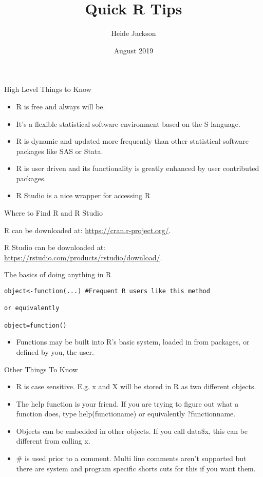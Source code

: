 \documentclass{beamer}
\title{Quick R Tips}
\author{Heide Jackson }
\date{August 2019}
\begin{document}
\maketitle

\begin{frame}{High Level Things to Know}
\begin{itemize}
\item R is free and always will be.
\item It's a flexible statistical software environment based on the S language.
\item R is dynamic and updated more frequently than other statistical software packages like SAS or Stata.
\item R is user driven and its functionality is greatly enhanced by user contributed packages.
\item R Studio is a nice wrapper for accessing R
\end{itemize}
\end{frame}


\begin{frame}{Where to Find R and R Studio}

\item R can be downloaded at: \url{https://cran.r-project.org/}.

\item R Studio can be downloaded at: \url{https://rstudio.com/products/rstudio/download/}.

\end{frame}

\begin{frame}[fragile]{The basics of doing anything in R}
\begin{verbatim}
object<-function(...) #Frequent R users like this method

or equivalently

object=function()
\end{verbatim}
\begin{itemize}
    \item Functions may be built into R's basic system, loaded in from packages, or defined by you, the user.
\end{itemize}
\end{frame}

\begin{frame}{Other Things To Know}
\begin{itemize}
    \item R is case sensitive. E.g. x and X will be stored in R as two different objects.
    \item The help function is your friend.  If you are trying to figure out what a function does, type help(functioname) or equivalently ?functionname.
    \item Objects can be embedded in other objects.  If you call data\$x, this can be different from calling x.
   \item \# is used prior to a comment.  Multi line comments aren't supported but there are system and program specific shorts cuts for this if you want them.
    \end{itemize}
    \end{frame}
\end{document}
